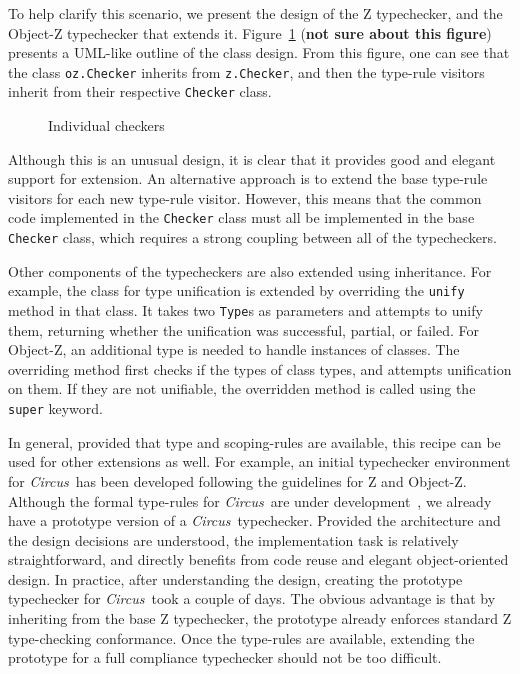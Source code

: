 \documentclass{llncs}
\newcommand{\Circus}{{\sf\slshape Circus}}
\begin{document}
To help clarify this scenario, we present the design of the Z typechecker, and the
Object-Z typechecker that extends it. Figure~\ref{tc-design} ({\bf not sure about this figure})
presents a UML-like outline of the class design. From this figure, one can see
that the class {\tt oz.Checker} inherits from {\tt z.Checker}, and then the type-rule visitors
inherit from their respective {\tt Checker} class.
%
\def\epsfsize#1#2{0.70#1}
\begin{figure}[t]
\begin{center}
\caption{Individual checkers}\label{tc-design}
\end{center}
\end{figure}
\def\epsfsize#1#2{\epsfxsize}
%
Although this is an unusual design, it is clear that it provides good and elegant support for extension.
An alternative approach is to extend the base type-rule visitors for each new type-rule visitor.
However, this means that the common code implemented in the {\tt Checker} class must all be
implemented in the base {\tt Checker} class, which requires a strong coupling between
all of the typecheckers.

Other components of the typecheckers are also extended using inheritance.
For example, the class for type unification is extended by overriding the {\tt unify} method in that class.
It takes two {\tt Type}s as parameters and attempts to unify them, returning whether the unification
was successful, partial, or failed.
For Object-Z, an additional type is needed to handle instances of classes.
The overriding method first checks if the types of class types, and attempts unification on them.
If they are not unifiable, the overridden method is called using the {\tt super} keyword.

In general, provided that type and scoping-rules are available, this recipe
can be used for other extensions as well.
For example, an initial typechecker environment for \Circus\ has been developed following
the guidelines for Z and Object-Z. Although the formal type-rules for \Circus\ are under
development~\cite{circus.other:typechecker}, we already have a prototype version of a \Circus\ typechecker.
Provided the architecture and the design decisions are understood, the implementation task is relatively
straightforward, and directly benefits from code reuse and elegant object-oriented design.
In practice, after understanding the design, creating the prototype typechecker for \Circus\ took a couple
of days. The obvious advantage is that by inheriting from the base Z typechecker, the prototype already enforces
standard Z type-checking conformance. Once the type-rules are available, extending the prototype for
a full compliance typechecker should not be too difficult.
\end{document}
